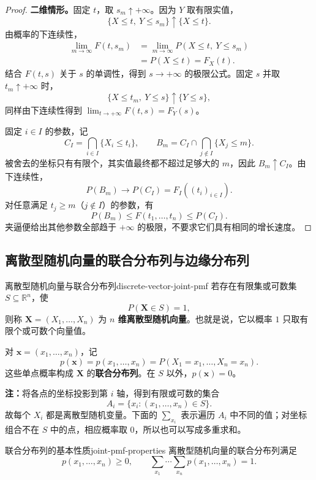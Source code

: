 \begin{proof}
\textbf{二维情形。}\quad 固定 $t$，取 $s_m\uparrow+\infty$。因为 $Y$ 取有限实值，
\[
\{X\leq t,\ Y\leq s_m\}\uparrow\{X\leq t\}.
\]
由概率的下连续性，
\begin{align*}
\lim_{m\to\infty}F(t,s_m)
&=\lim_{m\to\infty}P(X\leq t,\ Y\leq s_m)\\
&=P(X\leq t)=F_X(t).
\end{align*}
结合 $F(t,s)$ 关于 $s$ 的单调性，得到 $s\to+\infty$ 的极限公式。固定 $s$ 并取 $t_m\uparrow+\infty$ 时，
\[
\{X\leq t_m,\ Y\leq s\}\uparrow\{Y\leq s\},
\]
同样由下连续性得到 $\lim_{t\to+\infty}F(t,s)=F_Y(s)$。

固定 $i\in I$ 的参数，记
\[
C_I=\bigcap_{i\in I}\{X_i\leq t_i\},\qquad
B_m=C_I\cap\bigcap_{j\notin I}\{X_j\leq m\}.
\]
被舍去的坐标只有有限个，其实值最终都不超过足够大的 $m$，因此 $B_m\uparrow C_I$。由下连续性，
\[
P(B_m)\longrightarrow P(C_I)=F_I((t_i)_{i\in I}).
\]
对任意满足 $t_j\geq m$（$j\notin I$）的参数，有
\[
P(B_m)\leq F(t_1,\ldots,t_n)\leq P(C_I).
\]
夹逼便给出其他参数全部趋于 $+\infty$ 的极限，不要求它们具有相同的增长速度。
\end{proof}

\subsection*{离散型随机向量的联合分布列与边缘分布列}

\begin{mydefinition}{离散型随机向量与联合分布列}{discrete-vector-joint-pmf}
若存在有限集或可数集 $S\subseteq\mathbb R^n$，使
\[
P(\boldsymbol X\in S)=1,
\]
则称 $\boldsymbol X=(X_1,\ldots,X_n)$ 为 \textbf{$n$ 维离散型随机向量}。也就是说，它以概率 $1$ 只取有限个或可数个向量值。

对 $\boldsymbol x=(x_1,\ldots,x_n)$，记
\[
p(\boldsymbol x)=p(x_1,\ldots,x_n)
=P(X_1=x_1,\ldots,X_n=x_n).
\]
这些单点概率构成 $\boldsymbol X$ 的\textbf{联合分布列}。在 $S$ 以外，$p(\boldsymbol x)=0$。
\end{mydefinition}

\textbf{注：}\quad 将各点的坐标投影到第 $i$ 轴，得到有限或可数的集合
\[
A_i=\{x_i:(x_1,\ldots,x_n)\in S\}.
\]
故每个 $X_i$ 都是离散型随机变量。下面的 $\sum_{x_i}$ 表示遍历 $A_i$ 中不同的值；对坐标组合不在 $S$ 中的点，相应概率取 $0$，所以也可以写成多重求和。

\begin{proposition}{联合分布列的基本性质}{joint-pmf-properties}
离散型随机向量的联合分布列满足
\[
p(x_1,\ldots,x_n)\geq0,\qquad
\sum_{x_1}\cdots\sum_{x_n}p(x_1,\ldots,x_n)=1.
\]
\end{proposition}

